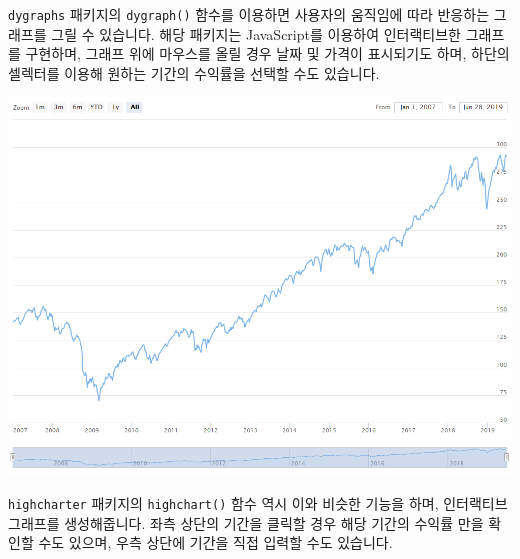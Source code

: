 \documentclass[12pt,]{book}
\newenvironment{Shaded}{\begin{snugshade}}{\end{snugshade}}
\newcommand{\DataTypeTok}[1]{\textcolor[rgb]{0.13,0.29,0.53}{#1}}
\newcommand{\KeywordTok}[1]{\textcolor[rgb]{0.13,0.29,0.53}{\textbf{#1}}}
\newcommand{\NormalTok}[1]{#1}
\newcommand{\OperatorTok}[1]{\textcolor[rgb]{0.81,0.36,0.00}{\textbf{#1}}}
\newcommand{\OtherTok}[1]{\textcolor[rgb]{0.56,0.35,0.01}{#1}}
\newcommand{\StringTok}[1]{\textcolor[rgb]{0.31,0.60,0.02}{#1}}
\begin{document}
\texttt{dygraphs} 패키지의 \texttt{dygraph()} 함수를 이용하면 사용자의 움직임에 따라 반응하는 그래프를 그릴 수 있습니다. 해당 패키지는 JavaScript를 이용하여 인터랙티브한 그래프를 구현하며, 그래프 위에 마우스를 올릴 경우 날짜 및 가격이 표시되기도 하며, 하단의 셀렉터를 이용해 원하는 기간의 수익률을 선택할 수도 있습니다.

\begin{Shaded}
\end{Shaded}

\begin{center}\includegraphics[width=0.7\linewidth]{images/highcharter} \end{center}

\texttt{highcharter} 패키지의 \texttt{highchart()} 함수 역시 이와 비슷한 기능을 하며, 인터랙티브 그래프를 생성해줍니다. 좌측 상단의 기간을 클릭할 경우 해당 기간의 수익률 만을 확인할 수도 있으며, 우측 상단에 기간을 직접 입력할 수도 있습니다.

\begin{Shaded}
\end{Shaded}
\end{document}
